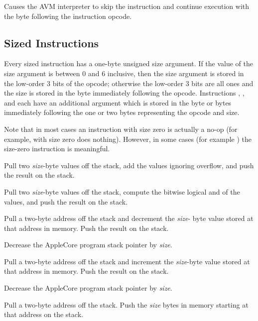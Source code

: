 \documentclass[10pt]{article}
\begin{document}
%
Causes the AVM interpreter to skip the instruction and
continue execution with the byte following the instruction
opcode.

\subsection{Sized Instructions}

Every sized instruction has a one-byte unsigned size argument.  If the
value of the size argument is between 0 and 6 inclusive, then the size
argument is stored in the low-order 3 bits of the opcode; otherwise
the low-order 3 bits are all ones and the size is stored in the byte
immediately following the opcode.  Instructions , ,
and  each have an additional argument which is stored in the
byte or bytes immediately following the one or two bytes representing
the opcode and size.

Note that in most cases an instruction with size zero is actually a
no-op (for example,  with size zero does nothing).  However,
in some cases (for example ) the size-zero instruction is
meaningful.

 Pull two \emph{size}-byte
values off the stack, add the values ignoring overflow, and push the
result on the stack.

 Pull two
\emph{size}-byte values off the stack, compute the bitwise logical and
of the values, and push the result on the stack.

 Pull a two-byte
address off the stack and decrement the \emph{size}- byte value stored
at that address in memory.  Push the result on the stack.

Decrease the AppleCore program stack pointer by \emph{size}.

 Pull a two-byte address
off the stack and increment the \emph{size}-byte value stored at that
address in memory.  Push the result on the stack.

Decrease the AppleCore program stack pointer by \emph{size}.

Pull a two-byte address off the stack. Push the \emph{size}
bytes in memory starting at that address on the stack.
\end{document}
